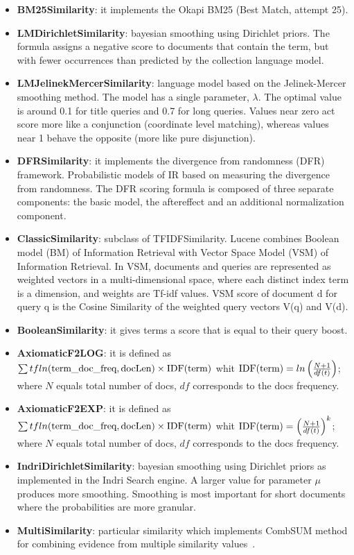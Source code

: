\begin{itemize}
    \item \textbf{BM25Similarity}: it implements the Okapi BM25 (Best Match, attempt 25).
    \item \textbf{LMDirichletSimilarity}: bayesian smoothing using Dirichlet priors. The formula assigns a negative score to documents that contain the term, but with fewer occurrences than predicted by the collection language model.
    \item \textbf{LMJelinekMercerSimilarity}: language model based on the Jelinek-Mercer smoothing method. The model has a single parameter, $\lambda$. The optimal value is around 0.1 for title queries and 0.7 for long queries. Values near zero act score more like a conjunction (coordinate level matching), whereas values near 1 behave the opposite (more like pure disjunction).
    \item \textbf{DFRSimilarity}: it implements the divergence from randomness (DFR) framework. Probabilistic models of IR based on measuring the divergence from randomness. The DFR scoring formula is composed of three separate components: the basic model, the aftereffect and an additional normalization component.
    \item \textbf{ClassicSimilarity}: subclass of TFIDFSimilarity. Lucene combines Boolean model (BM) of Information Retrieval with Vector Space Model (VSM) of Information Retrieval. In VSM, documents and queries are represented as weighted vectors in a multi-dimensional space, where each distinct index term is a dimension, and weights are Tf-idf values. VSM score of document d for query q is the Cosine Similarity of the weighted query vectors V(q) and V(d).
    \item \textbf{BooleanSimilarity}: it gives terms a score that is equal to their query boost.
    \item \textbf{AxiomaticF2LOG}: it is defined as $ \sum tfln(\textup{term\_doc\_freq}, \textup{docLen}) \times \textup{IDF(term)}$ whit $\textup{IDF(term)}=ln \left(\frac{N+1}{df(t)}\right)$; where $N$ equals total number of docs, $df$ corresponds to the docs frequency.
    \item \textbf{AxiomaticF2EXP}: it is defined as $ \sum tfln(\textup{term\_doc\_freq}, \textup{docLen}) \times \textup{IDF(term)}$ whit $\textup{IDF(term)}= \left({\frac{N+1}{df(t)}}\right)^k$; where $N$ equals total number of docs, $df$ corresponds to the docs frequency.
    \item \textbf{IndriDirichletSimilarity}: bayesian smoothing using Dirichlet priors as implemented in the Indri Search engine. A larger value for parameter $\mu$ produces more smoothing. Smoothing is most important for short documents where the probabilities are more granular.
    \item \textbf{MultiSimilarity}: particular similarity which implements CombSUM method for combining evidence from multiple similarity values~\cite{multisim}.
\end{itemize}
